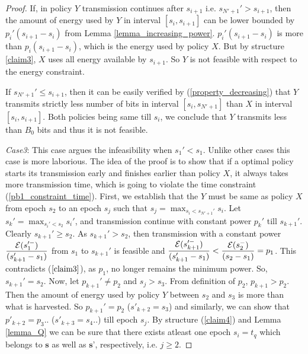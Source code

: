 \begin{proof}
If, in policy $Y$ transmission continues after $s_{i+1}$ i.e. $s_{N'+1}'>s_{i+1}$, then the amount of energy used by $Y$ in interval $[s_{i},s_{i+1}]$ can be lower bounded by $p_i'(s_{i+1}-s_i)$ from Lemma \ref{lemma_increasing_power}. $p_i'(s_{i+1}-s_i)$ is more than $p_i(s_{i+1}-s_i)$, which is the energy used by policy $X$. But by structure \eqref{claim3}, $X$ uses all energy available by $s_{i+1}$. So $Y$ is not feasible with respect to the energy constraint. 

If $s_{N'+1}'\le s_{i+1}$, then it can be easily verified by (\ref{property_decreasing}) that $Y$ transmits strictly less number of bits in interval $[s_i,s_{N'+1}]$ than $X$ in interval $[s_{i},s_{i+1}]$. Both policies being same till $s_i$, we conclude that $Y$ transmits less than $B_0$  bits and thus it is not feasible.

\textit{Case3}: This case argues the infeasibility when $s_1'<s_1$. Unlike other cases this case is more laborious. The idea of the proof is to show that if a optimal policy starts its transmission early and finishes earlier than policy $X$, it always takes more transmission time, which is going to violate the time constraint (\ref{pb1_constraint_time}). First, we establish that the $Y$ must be same as policy $X$ from epoch $s_2$ to an epoch $s_j$ such that $s_j=\displaystyle\max_{s_i<s_{N'+1}'} s_i$. Let $s_k'=\displaystyle\max_{s_i'<s_2}s_i'$, and transmission continue with constant power $p_k'$ till $s_{k+1}'$. Clearly $s_{k+1}'\ge s_2$. As $s_{k+1}'>s_2$, then transmission with a constant power $\dfrac{\mathcal{E}(s_1'^-)}{(s_{k+1}'-s_1)} $ from $s_1$ to $s_{k+1}'$ is feasible and $\dfrac{\mathcal{E}(s_{k+1}'^-)}{(s_{k+1}'-s_1)}<\dfrac{\mathcal{E}(s_2^-)}{(s_2-s_1)}=p_1$. This contradicts ($\ref{claim3}$), as $p_1$, no longer remains the minimum power. So, $s_{k+1}'=s_2$. Now, let $p_{k+1}'\neq p_2$ and $s_j>s_3$. From definition of $p_2$, $p_{k+1}>p_2$. Then the amount of energy used by policy $Y$ between $s_2$ and $s_3$ is more than what is harvested. So $p_{k+1}'=p_2$ ($s'_{k+2}=s_3$) and similarly, we can show that $p'_{k+2}=p_3$.. ($ s'_{k+3}=s_4$..) till epoch $s_j$. By structure (\ref{claim4}) and Lemma \ref{lemma_Q} we can be sure that there exists atleast one epoch $s_i=t_q$ which belongs to $\textbf{s}$ as well as $\textbf{s'}$, respectively, i.e. $j\ge 2$.


\end{proof}
